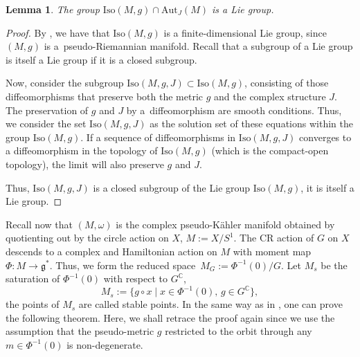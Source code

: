 \documentclass[10pt,a4paper]{amsart}
\numberwithin{equation}{section}
\newtheorem{Lemma}[Theorem]{Lemma}
\begin{document}
 	\begin{Lemma} \label{lem:finliegroup} The group $\mathrm{Iso}(M, g)\cap \mathrm{Aut}_J(M)$ is a Lie group.
 	\end{Lemma}
 	\begin{proof}
 		By \cite{k,ph}, we have that $\mathrm{Iso}(M, g)$ is a finite-dimensional Lie group, since $(M, g)$ is a~pseudo-Riemannian manifold. Recall that	a subgroup of a Lie group is itself a Lie group if it is a closed subgroup.
 		
 		Now, consider the subgroup $\mathrm{Iso}(M, g, J)\subset \mathrm{Iso}(M, g)$, consisting of those diffeomorphisms that preserve both the metric
 		$g$ and the complex structure $J$. The preservation of $g$ and	$J$ by a~diffeomorphism are smooth conditions. Thus, we consider the set $\mathrm{Iso}(M, g, J)$ as the solution set of these equations within the group $\mathrm{Iso}(M, g)$. If a sequence of diffeomorphisms in $\mathrm{Iso}(M, g, J)$ converges to a diffeomorphism in the topology of
 		$\mathrm{Iso}(M, g)$ (which is the compact-open topology), the limit will also preserve $g$ and
 		$J$.
 		
 		Thus, $\mathrm{Iso}(M, g, J)$ is a closed subgroup of the Lie group $\mathrm{Iso}(M, g)$, it is itself a Lie group.
 	\end{proof}

 	Recall now that $(M, \omega)$ is the complex pseudo-K\"ahler manifold obtained by quotienting out by the circle action on $X$, $M:=X/S^1$. The CR action of $G$ on $X$ descends to a complex and Hamiltonian action on $M$ with moment map $\Phi \colon M\rightarrow \mathfrak{g}^*$. Thus, we form the reduced space~${M_G:= \Phi^{-1}(0)/G}$.
 	Let $M_s$ be the saturation of $\Phi^{-1}(0)$ with respect to $G^{\mathbb{C}}$,
 	\[M_s:=\big\{g\circ x \mid x\in \Phi^{-1}(0),\, g\in G^{\mathbb{C}} \big\} , \]
 	the points of $M_s$ are called stable points. In the same way as in \cite[Theorem~4.5]{gs}, one can prove the following theorem. Here, we shall retrace the proof again since we use the assumption that the pseudo-metric $g$ restricted to the orbit through any $m\in \Phi^{-1}(0)$ is non-degenerate.
 	
\end{document}
